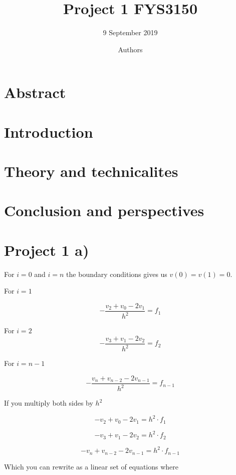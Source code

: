 \documentclass[]{article}
\title{Project 1 FYS3150}
\author{9 September 2019}
\date{Authors}
\begin{document}
\maketitle

\section*{Abstract}\label{abstract}

\section*{Introduction}\label{introduction}

\section*{Theory and technicalites}\label{theory-and-technicalites}

\section*{Conclusion and
perspectives}\label{conclusion-and-perspectives}

\section*{Project 1 a)}\label{project-1-a}

For $i = 0$ and $i = n$ the boundary conditions gives us
$v(0) = v(1) = 0$.

For $i = 1$

\[-\frac{v_2+v_0-2v_1}{h^2} = f_1\]

For $i = 2$\\ \[-\frac{v_3+v_1-2v_2}{h^2}{} = f_2\]

For $i = n-1$

\[-\frac{v_n+v_{n-2}-2v_{n-1}}{h^2}{} = f_{n-1}\]

If you multiply both sides by $h^2$

\[-{v_2+v_0-2v_1} = h^2\cdot{f_1}\]

\[-{v_3+v_1-2v_2} = {h^2}\cdot{f_2}\]

\[-v_n+v_{n-2}-2v_{n-1} = {h^2}\cdot{f_{n-1}}\]

Which you can rewrite as a linear set of equations where
\end{document}
